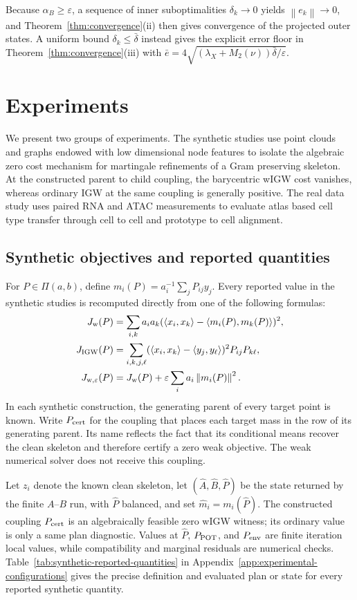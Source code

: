 \documentclass[11pt]{article}
\newcommand{\ip}[2]{\left\langle #1,#2\right\rangle}
\newcommand{\norm}[1]{\left\lVert #1\right\rVert}
\theoremstyle{plain}
\theoremstyle{definition}
\theoremstyle{remark}
\begin{document}
Because \(\alpha_B\ge\varepsilon\), a sequence of inner suboptimalities
\(\delta_k\to0\) yields \(\norm{e_k}\to0\), and
Theorem~\ref{thm:convergence}(ii) then gives convergence of the projected outer
states. A uniform bound \(\delta_k\le\bar\delta\) instead gives the explicit
error floor in Theorem~\ref{thm:convergence}(iii) with
\(\bar e=4\sqrt{(\lambda_X+M_2(\nu))\bar\delta/\varepsilon}\).

\section{Experiments}\label{sec:experiments}

We present two groups of experiments. The synthetic studies use point clouds and
graphs endowed with low dimensional node features to isolate the algebraic zero
cost mechanism for martingale refinements of a Gram preserving skeleton. At the
constructed parent to child coupling, the barycentric wIGW cost vanishes, whereas
ordinary IGW at the same coupling is generally positive. The real data study uses
paired RNA and ATAC measurements to evaluate atlas based cell type transfer through
cell to cell and prototype to cell alignment.

\subsection{Synthetic objectives and reported quantities}
\label{subsec:reported-quantities}

For $P\in\Pi(a,b)$, define $m_i(P)=a_i^{-1}\sum_jP_{ij}y_j$. Every reported value
in the synthetic studies is recomputed directly from one of the following formulas:
\[
\begin{aligned}
 J_{\rm w}(P)
 &=\sum_{i,k}a_i a_k
   (\ip{x_i}{x_k}-\ip{m_i(P)}{m_k(P)})^2,\\
 J_{\rm IGW}(P)
 &=\sum_{i,k,j,\ell}
   (\ip{x_i}{x_k}-\ip{y_j}{y_\ell})^2P_{ij}P_{k\ell},\\
 J_{\rm w,\varepsilon}(P)
 &=J_{\rm w}(P)+\varepsilon\sum_i a_i\norm{m_i(P)}^2.
\end{aligned}
\]
In each synthetic construction, the generating parent of every target point is
known. Write $P_{\rm cert}$ for the coupling that places each target mass in
the row of its generating parent. Its name reflects the fact that its
conditional means recover the clean skeleton and therefore certify a zero weak
objective. The weak numerical solver does not receive this coupling.

Let \(z_i\) denote the known clean skeleton, let
\((\widehat A,\widehat B,\widehat P)\) be the state returned by the finite
\(A\)--\(B\) run, with \(\widehat P\) balanced, and set
\(\widehat m_i=m_i(\widehat P)\). The constructed coupling \(P_{\rm cert}\)
is an algebraically feasible zero wIGW witness; its ordinary value is only a
same plan diagnostic. Values at \(\widehat P\), \(P_{\rm POT}\), and
\(P_{\rm env}\) are finite iteration local values, while compatibility and
marginal residuals are numerical checks. Table~\ref{tab:synthetic-reported-quantities}
in Appendix~\ref{app:experimental-configurations} gives the precise definition
and evaluated plan or state for every reported synthetic quantity.
\end{document}
